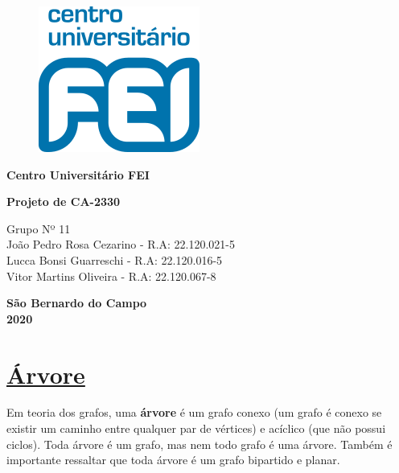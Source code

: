\documentclass{article}
\begin{document}
\begin{titlepage}
	\begin{figure}[H]
		\centering
		\includegraphics[width=0.1\linewidth]{Figuras/logofei}
		\label{fig:logofei}
	\end{figure}
	
	\begin{center}
		{\large \textbf{Centro Universitário FEI} }
	\end{center}
	
	\vspace*{3cm}
	
	\begin{center}
		{\Large {\bf{ Projeto de CA-2330 \\ 
					\vspace*{0.5cm}{\large Relatório - Parte 4}}}}
	\end{center}\vspace*{5cm}
	
	\begin{center}
		Grupo Nº 11 \vspace*{0.2cm} \\ João Pedro Rosa Cezarino - R.A: 22.120.021-5  \\ Lucca Bonsi Guarreschi - R.A: 22.120.016-5  \\ Vitor Martins Oliveira - R.A: 22.120.067-8
	\end{center}
	
	\vspace*{7cm}
	\begin{center} \textbf{São Bernardo do Campo \\ 2020}\end{center}
	
\end{titlepage}
	\newpage
	\setcounter{page}{1} %
	
	\section{{\Large \underline{Árvore}}}
		Em teoria dos grafos, uma \textbf{árvore} é um grafo conexo (um grafo é conexo se existir um caminho entre qualquer par de vértices) e acíclico (que não possui ciclos). Toda árvore é um grafo, mas nem todo grafo é uma árvore. Também é importante ressaltar que toda árvore é um grafo bipartido e planar.\vspace*{0.2cm}
		
\end{document}
